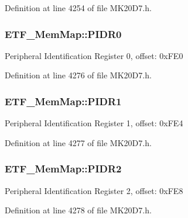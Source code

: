 Definition at line 4254 of file M\+K20\+D7.\+h.

\subsubsection[{\texorpdfstring{P\+I\+D\+R0}{PIDR0}}]{ E\+T\+F\+\_\+\+Mem\+Map\+::\+P\+I\+D\+R0}\hypertarget{struct_e_t_f___mem_map_a0ed9ad5240882ee853a4f4e8871c145f}{}\label{struct_e_t_f___mem_map_a0ed9ad5240882ee853a4f4e8871c145f}
Peripheral Identification Register 0, offset\+: 0x\+F\+E0 

Definition at line 4276 of file M\+K20\+D7.\+h.

\subsubsection[{\texorpdfstring{P\+I\+D\+R1}{PIDR1}}]{ E\+T\+F\+\_\+\+Mem\+Map\+::\+P\+I\+D\+R1}\hypertarget{struct_e_t_f___mem_map_a70c724eb6523bbe1eedd98c71922cf65}{}\label{struct_e_t_f___mem_map_a70c724eb6523bbe1eedd98c71922cf65}
Peripheral Identification Register 1, offset\+: 0x\+F\+E4 

Definition at line 4277 of file M\+K20\+D7.\+h.

\subsubsection[{\texorpdfstring{P\+I\+D\+R2}{PIDR2}}]{ E\+T\+F\+\_\+\+Mem\+Map\+::\+P\+I\+D\+R2}\hypertarget{struct_e_t_f___mem_map_a4b3e618b1219f136bfd2e2846b1c1b1c}{}\label{struct_e_t_f___mem_map_a4b3e618b1219f136bfd2e2846b1c1b1c}
Peripheral Identification Register 2, offset\+: 0x\+F\+E8 

Definition at line 4278 of file M\+K20\+D7.\+h.

